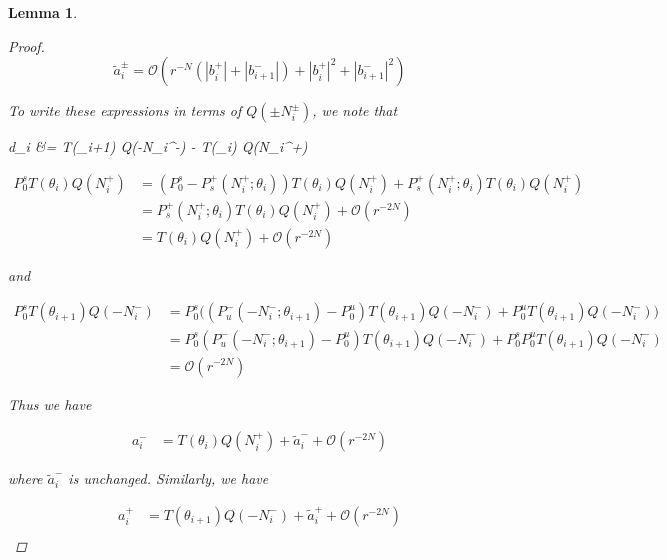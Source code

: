 \documentclass[12pt]{article}
\newtheorem{lemma}{Lemma}
\begin{document}
\begin{lemma}
\begin{proof}
\[
\tilde{a}_i^\pm = \mathcal{O}(r^{-N}(|b_i^+|+|b_{i+1}^-|) + |b_i^+|^2+|b_{i+1}^-|^2) 
\]

To write these expressions in terms of $Q(\pm N_i^\pm)$, we note that

d_i &= T(\theta_{i+1}) Q(-N_i^-) - T(\theta_i) Q(N_i^+)

\begin{align*}
P_0^s T(\theta_i) Q(N_i^+) &= (P_0^s - P_s^+(N_i^+; \theta_i)) T(\theta_i) Q(N_i^+) + P_s^+(N_i^+; \theta_i) T(\theta_i) Q(N_i^+) \\
&= P_s^+(N_i^+; \theta_i) T(\theta_i) Q(N_i^+) + \mathcal{O}(r^{-2N}) \\
&= T(\theta_i) Q(N_i^+) + \mathcal{O}(r^{-2N}) 
\end{align*}

and 

\begin{align*}
P_0^s T(\theta_{i+1}) Q(-N_i^-) 
&= P_0^s \Big( ( P_u^-(-N_i^-; \theta_{i+1}) - P_0^u) T(\theta_{i+1}) Q(-N_i^-) + P_0^u T(\theta_{i+1}) Q(-N_i^-) \Big) \\
&= P_0^s ( P_u^-(-N_i^-; \theta_{i+1}) - P_0^u) T(\theta_{i+1}) Q(-N_i^-) + P_0^s P_0^u T(\theta_{i+1}) Q(-N_i^-) \\
&= \mathcal{O}(r^{-2N})
\end{align*}

Thus we have

\begin{align*}
a_i^- &= T(\theta_i) Q(N_i^+) + \tilde{a}_i^- + \mathcal{O}(r^{-2N})
\end{align*}

where $\tilde{a}_i^-$ is unchanged. Similarly, we have

\begin{align*}
a_i^+ &= T(\theta_{i+1}) Q(-N_i^-) + \tilde{a}_i^+ + \mathcal{O}(r^{-2N}) \\
\end{align*}

\end{proof}
\end{lemma}
\end{document}
